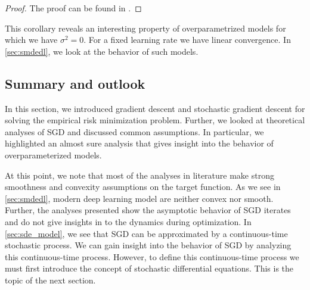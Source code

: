 \documentclass[12pt]{article}
\theoremstyle{definition}
\newtheorem{assumption}[assumption]{Assumption}
\numberwithin{equation}{section}
\newcommand{\R}{\mathbb{R}}
\begin{document}
\begin{proof}
  The proof can be found in \cite{sebbouhAlmostSureConvergence2021}.
\end{proof}
  This corollary reveals an interesting property of overparametrized models for which we have $\sigma^2 = 0$. For a fixed learning rate we have linear convergence. In \autoref{sec:smdedl}, we look at the behavior of such models.

\subsection{Summary and outlook}
In this section, we introduced gradient descent and stochastic gradient descent for solving the empirical risk minimization problem. Further, we looked at theoretical analyses of SGD and discussed common assumptions. In particular, we highlighted an almost sure analysis that gives insight into the behavior of overparameterized models. 

At this point, we note that most of the analyses in literature make strong smoothness and convexity assumptions on the target function. As we see in \autoref{sec:smdedl}, modern deep learning model are neither convex nor smooth. Further, the analyses presented show the asymptotic behavior of SGD iterates and do not give insights in to the dynamics during optimization. 
In \autoref{sec:sde_model}, we see that SGD can be approximated by a continuous-time stochastic process. We can gain insight into the behavior of SGD by analyzing this continuous-time process. However, to define this continuous-time process we must first introduce the concept of stochastic differential equations. This is the topic of the next section.
\end{document}
